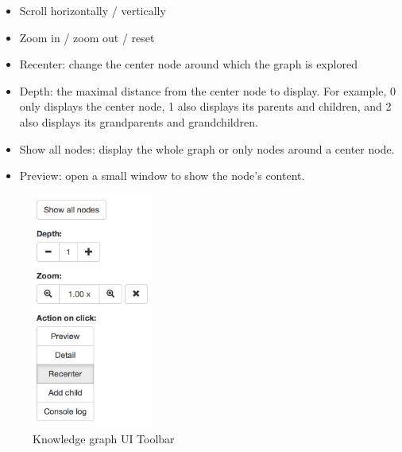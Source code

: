 \documentclass{acm_proc_article-sp}
\begin{document}
\begin{itemize}
\item Scroll horizontally / vertically
\item Zoom in / zoom out / reset
\item Recenter: change the center node around which the graph is explored
\item Depth: the maximal distance from the center node to display. 
For example, 0 only displays the center node, 1 also displays its parents and children, and 2 also displays its grandparents and grandchildren.
\item Show all nodes: display the whole graph or only nodes around a center node.
\item Preview: open a small window to show the node's content.
\end{itemize}
\begin{figure}[h!]
\centering
\includegraphics[width=4cm]{toolbar2.png}
\caption{Knowledge graph UI Toolbar}
\end{figure}
\end{document}

